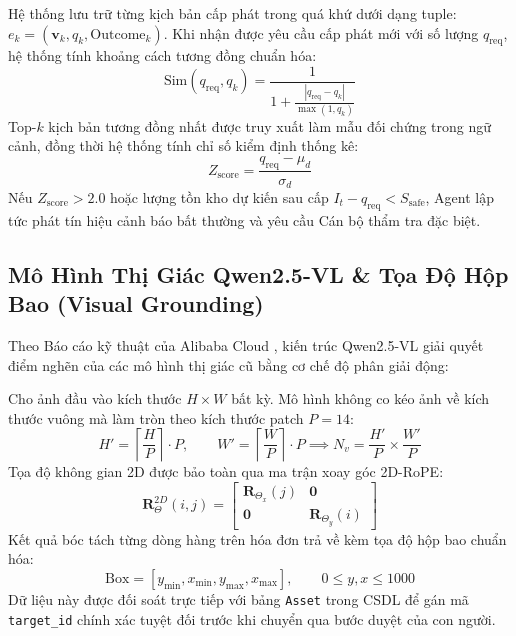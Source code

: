 \documentclass[11pt,a4paper]{article}
\begin{document}
\begin{formulationbox}
Hệ thống lưu trữ từng kịch bản cấp phát trong quá khứ dưới dạng tuple: $e_k = (\mathbf{v}_k, q_k, \text{Outcome}_k)$. Khi nhận được yêu cầu cấp phát mới với số lượng $q_{\text{req}}$, hệ thống tính khoảng cách tương đồng chuẩn hóa:
\begin{equation}
    \text{Sim}(q_{\text{req}}, q_k) = \frac{1}{1 + \frac{|q_{\text{req}} - q_k|}{\max(1, q_k)}}
\end{equation}
Top-$k$ kịch bản tương đồng nhất được truy xuất làm mẫu đối chứng trong ngữ cảnh, đồng thời hệ thống tính chỉ số kiểm định thống kê:
\begin{equation}
    Z_{\text{score}} = \frac{q_{\text{req}} - \mu_d}{\sigma_d}
\end{equation}
Nếu $Z_{\text{score}} > 2.0$ hoặc lượng tồn kho dự kiến sau cấp $I_t - q_{\text{req}} < S_{\text{safe}}$, Agent lập tức phát tín hiệu cảnh báo bất thường và yêu cầu Cán bộ thẩm tra đặc biệt.
\end{formulationbox}

\subsection{Mô Hình Thị Giác Qwen2.5-VL \& Tọa Độ Hộp Bao (Visual Grounding)}

Theo Báo cáo kỹ thuật của Alibaba Cloud \cite{qwen25vl2026}, kiến trúc Qwen2.5-VL giải quyết điểm nghẽn của các mô hình thị giác cũ bằng cơ chế độ phân giải động:

\begin{formulationbox}
Cho ảnh đầu vào kích thước $H \times W$ bất kỳ. Mô hình không co kéo ảnh về kích thước vuông mà làm tròn theo kích thước patch $P = 14$:
\begin{equation}
    H' = \left\lceil \frac{H}{P} \right\rceil \cdot P, \qquad W' = \left\lceil \frac{W}{P} \right\rceil \cdot P \implies N_v = \frac{H'}{P} \times \frac{W'}{P}
\end{equation}
Tọa độ không gian 2D được bảo toàn qua ma trận xoay góc 2D-RoPE:
\begin{equation}
    \mathbf{R}_{\Theta}^{2D}(i, j) = \begin{bmatrix} \mathbf{R}_{\Theta_x}(j) & \mathbf{0} \\ \mathbf{0} & \mathbf{R}_{\Theta_y}(i) \end{bmatrix}
\end{equation}
Kết quả bóc tách từng dòng hàng trên hóa đơn trả về kèm tọa độ hộp bao chuẩn hóa:
\begin{equation}
    \text{Box} = [y_{\min}, x_{\min}, y_{\max}, x_{\max}], \qquad 0 \le y, x \le 1000
\end{equation}
Dữ liệu này được đối soát trực tiếp với bảng \texttt{Asset} trong CSDL để gán mã \texttt{target\_id} chính xác tuyệt đối trước khi chuyển qua bước duyệt của con người.
\end{formulationbox}
\end{document}

